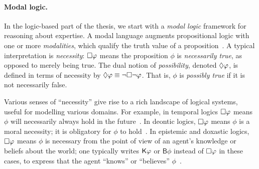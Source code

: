 \paragraph{Modal logic.}

{



In the logic-based part of the thesis, we start with a \emph{modal logic}
framework for reasoning about expertise. A modal language augments
propositional logic with one or more \emph{modalities}, which qualify
the truth value of a proposition~\cite{seplogicmodal}. A typical interpretation
is \emph{necessity}: $\Box\varphi$ means the proposition $\phi$ is
\emph{necessarily true}, as opposed to merely being true. The dual notion of
\emph{possibility}, denoted $\Diamond\varphi$, is defined in terms of necessity
by $\Diamond\varphi \equiv \neg\Box\neg\varphi$. That is, $\phi$ is
\emph{possibly true} if it is not necessarily false.

Various senses of ``necessity'' give rise to a rich landscape of logical
systems, useful for modelling various domains. For example, in temporal logics
$\Box\varphi$ means $\phi$ will necessarily always hold in the
future~\cite{goranko_temporal}. In deontic logics, $\Box\varphi$ means $\phi$
is a moral necessity; it is obligatory for $\phi$ to
hold~\cite{mcnama_deontic}. In epistemic and doxastic logics, $\Box\varphi$
means $\phi$ is necessary from the point of view of an agent's knowledge or
beliefs about the world; one typically writes $\mathsf{K}\varphi$ or $\mathsf{B}\phi$
instead of $\Box\varphi$ in these cases, to express that the agent ``knows''
or ``believes'' $\phi$~\cite{rendsvig_epistemic}.

}

